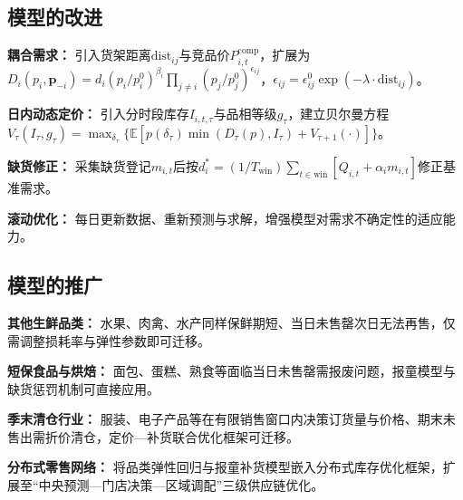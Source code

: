 \subsection{模型的改进}
\textbf{耦合需求：} 引入货架距离$\text{dist}_{ij}$与竞品价$P_{i,t}^{\text{comp}}$，扩展为$D_i(p_i,\mathbf{p}_{-i})=d_i(p_i/p_i^0)^{\beta_i}\prod_{j\ne i}(p_j/p_j^0)^{\epsilon_{ij}}$，$\epsilon_{ij}=\epsilon_{ij}^0\exp(-\lambda\cdot\text{dist}_{ij})$。

\textbf{日内动态定价：} 引入分时段库存$I_{i,t,\tau}$与品相等级$g_\tau$，建立贝尔曼方程$V_\tau(I_\tau,g_\tau)=\max_{\delta_\tau}\{\mathbb{E}[p(\delta_\tau)\min(D_\tau(p),I_\tau)+V_{\tau+1}(\cdot)]\}$。

\textbf{缺货修正：} 采集缺货登记$m_{i,t}$后按$d_i^*=(1/T_{\text{win}})\sum_{t\in\text{win}}[Q_{i,t}+\alpha_i m_{i,t}]$修正基准需求。

\textbf{滚动优化：} 每日更新数据、重新预测与求解，增强模型对需求不确定性的适应能力。

\subsection{模型的推广}
\textbf{其他生鲜品类：} 水果、肉禽、水产同样保鲜期短、当日未售罄次日无法再售，仅需调整损耗率与弹性参数即可迁移。

\textbf{短保食品与烘焙：} 面包、蛋糕、熟食等面临当日未售罄需报废问题，报童模型与缺货惩罚机制可直接应用。

\textbf{季末清仓行业：} 服装、电子产品等在有限销售窗口内决策订货量与价格、期末未售出需折价清仓，定价—补货联合优化框架可迁移。

\textbf{分布式零售网络：} 将品类弹性回归与报童补货模型嵌入分布式库存优化框架，扩展至“中央预测—门店决策—区域调配”三级供应链优化。